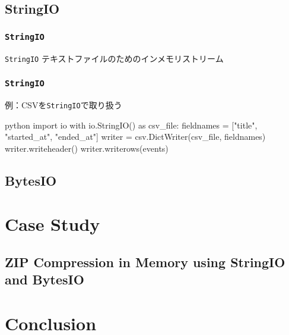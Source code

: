 \documentclass[dvipdfmx,12pt,notheorems]{beamer}
\theoremstyle{definition}
\begin{document}
\subsection{StringIO}

\begin{frame}\frametitle{\texttt{StringIO}}
\begin{block}{\texttt{StringIO}}
テキストファイルのためのインメモリストリーム
\end{block}
\end{frame}

\begin{frame}[fragile]\frametitle{\texttt{StringIO}}

\begin{exampleblock}{例：CSVを\texttt{StringIO}で取り扱う}
\begin{pygments}{python}
import io
with io.StringIO() as csv_file:
    fieldnames = ["title", "started_at", "ended_at"]
    writer = csv.DictWriter(csv_file, fieldnames)
    writer.writeheader()
    writer.writerows(events)
\end{pygments}
\end{exampleblock}

\end{frame}

\subsection{BytesIO}

\section{Case Study}

\subsection{ZIP Compression in Memory using StringIO and BytesIO}

\section{Conclusion}
\end{document}

